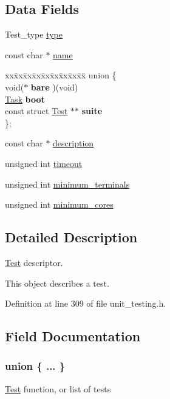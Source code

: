 \subsection*{Data Fields}
\begin{DoxyCompactItemize}
\item 
Test\+\_\+type \hyperlink{structTest_a5074007b777ea0958966027197c17792}{type}
\item 
const char $\ast$ \hyperlink{structTest_ae44674e48b203d9c26e04e09b6fe5b61}{name}
\item 
\begin{tabbing}
xx\=xx\=xx\=xx\=xx\=xx\=xx\=xx\=xx\=\kill
union \{\\
\>void($\ast$ {\bfseries bare} )(void)\\
\>\hyperlink{group__syscalls_gaec3f2f835e105271fbbc00272c0ba984}{Task} {\bfseries boot}\\
\>const struct \hyperlink{structTest}{Test} $\ast$$\ast$ {\bfseries suite}\\
\}; \\

\end{tabbing}\item 
const char $\ast$ \hyperlink{structTest_a294ca3f1114240c908f66216afcad783}{description}
\item 
unsigned int \hyperlink{structTest_a80e78f2e6aeed2a6e5b7c705ce5a1493}{timeout}
\item 
unsigned int \hyperlink{structTest_a2741188633c51b8e3cb545fa3971bf60}{minimum\+\_\+terminals}
\item 
unsigned int \hyperlink{structTest_ac203918837b4c6718a020246e189a95a}{minimum\+\_\+cores}
\end{DoxyCompactItemize}


\subsection{Detailed Description}
\hyperlink{structTest}{Test} descriptor. 

This object describes a test. 

Definition at line 309 of file unit\+\_\+testing.\+h.



\subsection{Field Documentation}
\subsubsection[{\texorpdfstring{"@3}{@3}}]{\setlength{\rightskip}{0pt plus 5cm}union \{ ... \} }\hypertarget{structTest_a6dd50dae1a4469e7723e85331dbf9ba0}{}\label{structTest_a6dd50dae1a4469e7723e85331dbf9ba0}
\hyperlink{structTest}{Test} function, or list of tests 
